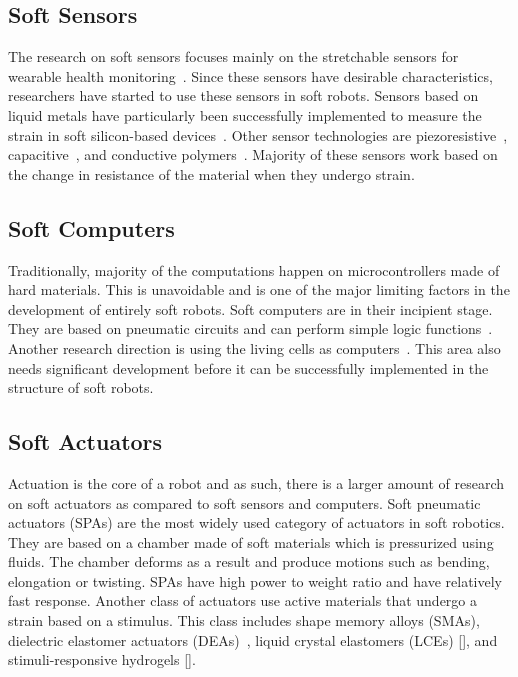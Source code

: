\subsection{Soft Sensors}
The research on soft sensors focuses mainly on the stretchable sensors for wearable health monitoring~\cite{Liu2017c,Amjadi2016a}. Since these sensors have desirable characteristics, researchers have started to use these sensors in soft robots. Sensors based on liquid metals have particularly been successfully implemented to measure the strain in soft silicon-based devices~\cite{Hammond2014,Chossat2013, Wang2019c,Ren2020}. Other sensor technologies are piezoresistive~\cite{Georgopoulou2020,Turgut2018,Melnykowycz2016}, capacitive~\cite{Hohimer2020,Cao2020,White2017,Frutiger2015}, and conductive polymers~\cite{Chen2021,Kanoun2021,Harito2020}. Majority of these sensors work based on the change in resistance of the material when they undergo strain. 
\subsection{Soft Computers}
Traditionally,  majority of the computations happen on microcontrollers made of hard materials. This is unavoidable and is one of the major limiting factors in the development of entirely soft robots. Soft computers are in their incipient stage. They are based on pneumatic circuits and can perform simple logic functions~\cite{Preston2019,Garrad2019}. Another research direction is using the living cells as computers~\cite{Daniel2013}. This area also needs significant development before it can be successfully implemented in the structure of soft robots. 
\subsection{Soft Actuators}
Actuation is the core of a robot and as such, there is a larger amount of research on soft actuators as compared to soft sensors and computers. Soft pneumatic actuators (SPAs) \cite{Gorissen2017, Branyan2018} are the most widely used category of actuators in soft robotics. They are based on a chamber made of soft materials which is pressurized using fluids. The chamber deforms as a result and produce motions such as bending, elongation or twisting. SPAs have high power to weight ratio and have relatively fast response.  Another class of actuators use active materials that undergo a strain based on a stimulus. This class includes shape memory alloys (SMAs)\cite{}, dielectric elastomer actuators (DEAs)~\cite{}, liquid crystal elastomers (LCEs) [], and stimuli-responsive hydrogels []. 
 
